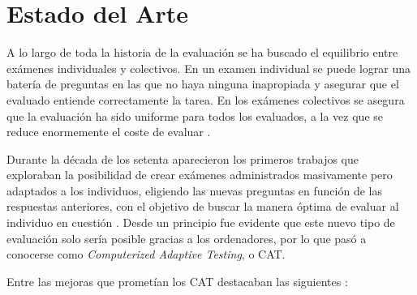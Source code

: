\chapter{Estado del Arte\label{sec:estado_del_arte}}

A lo largo de toda la historia de la evaluación se ha buscado el equilibrio entre exámenes individuales y colectivos. En un examen individual se puede lograr una batería de preguntas en las que no haya ninguna inapropiada y asegurar que el evaluado entiende correctamente la tarea. En los exámenes colectivos se asegura que la evaluación ha sido uniforme para todos los evaluados, a la vez que se reduce enormemente el coste de evaluar \cite{Wainer00}.

Durante la década de los setenta aparecieron los primeros trabajos que exploraban la posibilidad de crear exámenes administrados masivamente pero adaptados a los individuos, eligiendo las nuevas preguntas en función de las respuestas anteriores, con el objetivo de buscar la manera óptima de evaluar al individuo en cuestión \cite{Lord68}. Desde un principio fue evidente que este nuevo tipo de evaluación solo sería posible gracias a los ordenadores, por lo que pasó a conocerse como \textit{Computerized Adaptive Testing}, o \acrshort{CAT}.

Entre las mejoras que prometían los \acrshort{CAT} destacaban las siguientes \cite{Green83}:

